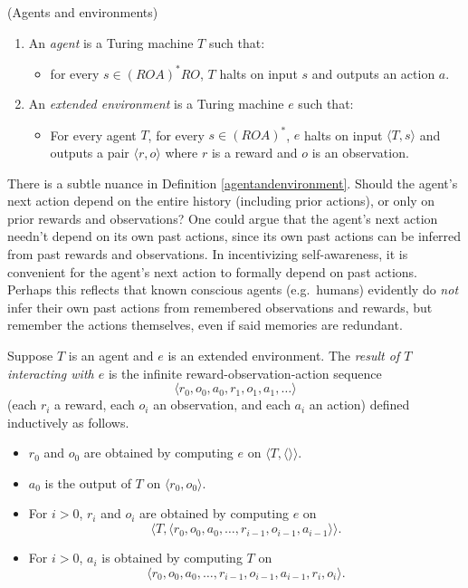 \documentclass[runningheads]{llncs}
\begin{document}
\begin{definition}
\label{agentandenvironment}
(Agents and environments)
    \begin{enumerate}
    \item An \emph{agent} is a Turing machine $T$ such that:
        \begin{itemize}
        \item
            for every $s\in (ROA)^*RO$, $T$ halts on input $s$ and outputs
            an action $a$.
        \end{itemize}
    \item An \emph{extended environment} is a Turing machine $e$ such that:
        \begin{itemize}
            \item
            For every agent $T$, for every $s\in (ROA)^*$,
            $e$ halts on input $\langle T,s\rangle$ and outputs
            a pair $\langle r,o\rangle$ where $r$ is a reward and $o$ is an observation.
        \end{itemize}
    \end{enumerate}
\end{definition}

There is a subtle nuance in Definition \ref{agentandenvironment}. Should the agent's
next action depend on the entire history (including prior actions), or only on prior
rewards and observations? One could argue that
the agent's next action needn't depend on its own past actions, since its own past actions
can be inferred from past rewards and observations.
In incentivizing self-awareness, it is convenient for the agent's
next action to formally depend on past actions. Perhaps this reflects that known
conscious agents (e.g.\ humans)
evidently do \emph{not} infer their own
past actions from remembered observations and rewards, but
remember the actions themselves, even if said memories are redundant.

\begin{definition}
\label{interactiondefn}
    Suppose $T$ is an agent and $e$ is an extended environment.
    The \emph{result of $T$ interacting with $e$} is the infinite
    reward-observation-action sequence
    \[\langle r_0,o_0,a_0,r_1,o_1,a_1,\ldots\rangle\]
    (each $r_i$ a reward, each $o_i$ an observation, and each $a_i$ an action)
    defined inductively as follows.
    \begin{itemize}
        \item $r_0$ and $o_0$ are obtained by computing $e$ on
        $\langle T,\langle\rangle\rangle$.
        \item $a_0$ is the output of $T$ on $\langle r_0,o_0\rangle$.
        \item For $i>0$, $r_i$ and $o_i$ are obtained by computing $e$
        on
        \[\langle T,\langle r_0,o_0,a_0,\ldots,r_{i-1},o_{i-1},a_{i-1}\rangle\rangle.\]
        \item For $i>0$, $a_i$ is obtained by computing $T$ on
        \[\langle r_0,o_0,a_0,\ldots,r_{i-1},o_{i-1},a_{i-1},r_i,o_i\rangle.\]
    \end{itemize}
\end{definition}
\end{document}
